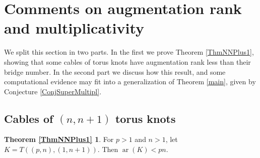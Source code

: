 \documentclass[11pt]{amsart}
\def\ar{\operatorname{ar}}
\theoremstyle{definition}
\begin{document}
\section{Comments on augmentation rank and multiplicativity}
\label{SecComments}

We split this section in two parts. In the first we prove Theorem \ref{ThmNNPlus1}, showing that some cables of torus knots have augmentation rank less than their bridge number. In the second part we discuss how this result, and some computational evidence may fit into a generalization of Theorem \ref{main}, given by Conjecture \ref{ConjSuperMultipl}.

\subsection{Cables of $(n,n+1)$ torus knots}
\label{SecNNPlus1}

\newtheorem*{ThmNNPlus1}{Theorem \ref{ThmNNPlus1}}
\begin{ThmNNPlus1}For $p>1$ and $n>1$, let $K=T((p,n),(1,n+1))$. Then $\ar(K) < pn$.
\end{ThmNNPlus1}
\end{document}
